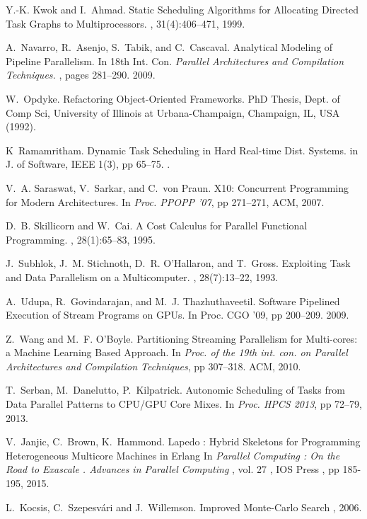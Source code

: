 \documentclass[smallextended]{svjour3}
\begin{document}
\begin{thebibliography}{}
Y.-K. Kwok and I.~Ahmad.
\newblock Static Scheduling Algorithms for Allocating Directed Task Graphs to
  Multiprocessors.
, 31(4):406--471, 1999.

A.~Navarro, R.~Asenjo, S.~Tabik, and C.~Cascaval.
\newblock Analytical Modeling of Pipeline Parallelism.
\newblock In {18th Int. Con. \em Parallel Architectures and Compilation Techniques.
}, pages 281--290. 2009.

W.~Opdyke.
\newblock Refactoring Object-Oriented Frameworks.
\newblock PhD Thesis, Dept. of Comp Sci, University of Illinois at Urbana-Champaign, Champaign, IL, USA (1992).

K~Ramamritham.
\newblock Dynamic Task Scheduling in Hard Real-time Dist. Systems.
\newblock in {J. of Software, IEEE 1(3), pp 65--75}.
.

V.~A. Saraswat, V.~Sarkar, and C.~von Praun.
\newblock X10: Concurrent Programming for Modern Architectures.
\newblock In {\em Proc. PPOPP '07}, pp 271--271, ACM, 2007.


D.~B. Skillicorn and W.~Cai.
\newblock A {C}ost {C}alculus for {P}arallel {F}unctional {P}rogramming.
, 28(1):65--83, 1995.

J.~Subhlok, J.~M. Stichnoth, D.~R. O'Hallaron, and T.~Gross.
\newblock Exploiting Task and Data Parallelism on a Multicomputer.
, 28(7):13--22, 1993.

A.~Udupa, R.~Govindarajan, and M.~J. Thazhuthaveetil.
\newblock Software Pipelined Execution of Stream Programs on GPUs.
\newblock In {Proc. CGO '09}, pp 200--209. 2009.

Z.~Wang and M.~F. O'Boyle.
\newblock Partitioning Streaming Parallelism for Multi-cores: a Machine
  Learning Based Approach.
\newblock In {\em Proc. of the 19th int. con. on Parallel
  Architectures and Compilation Techniques}, pp 307--318. ACM, 2010.
  
  T.~Serban, M.~Danelutto, P.~Kilpatrick.
  \newblock Autonomic Scheduling of Tasks from Data Parallel Patterns to CPU/GPU Core Mixes.
  \newblock In {\em Proc. HPCS 2013}, pp 72--79, 2013.

 V.~Janjic, C.~Brown, K.~Hammond. 
 \newblock Lapedo : Hybrid Skeletons for Programming Heterogeneous Multicore Machines in Erlang 
 \newblock In {\em Parallel Computing : On the Road to Exascale
   . Advances in Parallel Computing} , vol. 27 , IOS Press , pp
 185-195, 2015.

  L.~Kocsis, C.~Szepesv{\'a}ri and J.~Willemson.
  \newblock Improved Monte-Carlo Search
  , 2006.

 
\end{thebibliography}
\end{document}
